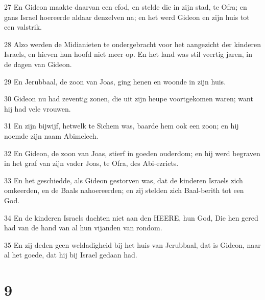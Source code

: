 \par 27 En Gideon maakte daarvan een efod, en stelde die in zijn stad, te Ofra; en gans Israel hoereerde aldaar denzelven na; en het werd Gideon en zijn huis tot een valstrik.
\par 28 Alzo werden de Midianieten te ondergebracht voor het aangezicht der kinderen Israels, en hieven hun hoofd niet meer op. En het land was stil veertig jaren, in de dagen van Gideon.
\par 29 En Jerubbaal, de zoon van Joas, ging henen en woonde in zijn huis.
\par 30 Gideon nu had zeventig zonen, die uit zijn heupe voortgekomen waren; want hij had vele vrouwen.
\par 31 En zijn bijwijf, hetwelk te Sichem was, baarde hem ook een zoon; en hij noemde zijn naam Abimelech.
\par 32 En Gideon, de zoon van Joas, stierf in goeden ouderdom; en hij werd begraven in het graf van zijn vader Joas, te Ofra, des Abi-ezriets.
\par 33 En het geschiedde, als Gideon gestorven was, dat de kinderen Israels zich omkeerden, en de Baals nahoereerden; en zij stelden zich Baal-berith tot een God.
\par 34 En de kinderen Israels dachten niet aan den HEERE, hun God, Die hen gered had van de hand van al hun vijanden van rondom.
\par 35 En zij deden geen weldadigheid bij het huis van Jerubbaal, dat is Gideon, naar al het goede, dat hij bij Israel gedaan had.

\chapter{9}

